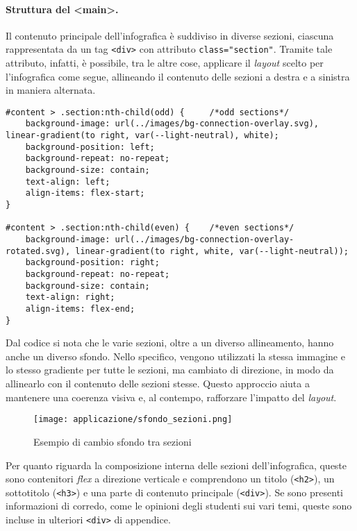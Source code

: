 \paragraph{Struttura del <main>.}\label{par:app_main} 
Il contenuto principale dell'infografica è suddiviso in diverse sezioni, ciascuna rappresentata da un tag \texttt{<div>} con attributo \texttt{class="section"}. Tramite tale attributo, infatti,
è possibile, tra le altre cose, applicare il \emph{layout} scelto per l'infografica come segue, allineando il contenuto delle sezioni a destra e a sinistra in maniera alternata.
\begin{lstlisting}[style=htmlcssjs]
#content > .section:nth-child(odd) {     /*odd sections*/
    background-image: url(../images/bg-connection-overlay.svg), linear-gradient(to right, var(--light-neutral), white);
    background-position: left;
    background-repeat: no-repeat;
    background-size: contain;
    text-align: left;
    align-items: flex-start;
}

#content > .section:nth-child(even) {    /*even sections*/
    background-image: url(../images/bg-connection-overlay-rotated.svg), linear-gradient(to right, white, var(--light-neutral));
    background-position: right;
    background-repeat: no-repeat;
    background-size: contain;
    text-align: right;
    align-items: flex-end;
}
\end{lstlisting}
Dal codice si nota che le varie sezioni, oltre a un diverso allineamento, hanno anche un diverso sfondo. Nello specifico, vengono utilizzati la stessa immagine 
e lo stesso gradiente per tutte le sezioni, ma cambiato di direzione, in modo da allinearlo con il contenuto delle sezioni stesse. 
Questo approccio aiuta a mantenere una coerenza visiva e, al contempo, rafforzare l'impatto del \emph{layout}.
\begin{figure}[h]
    \centering
    \texttt{[image: applicazione/sfondo\_sezioni.png]}
    \caption{Esempio di cambio sfondo tra sezioni}
    \label{fig:app_sfondo_sezione}
\end{figure}

Per quanto riguarda la composizione interna delle sezioni dell'infografica, queste sono contenitori \emph{flex} a direzione verticale e comprendono un titolo (\texttt{<h2>}), un sottotitolo (\texttt{<h3>}) e una parte di 
contenuto principale (\texttt{<div>}). Se sono presenti informazioni di corredo, come le opinioni degli studenti sui vari temi, queste sono incluse in ulteriori \texttt{<div>} di appendice.

